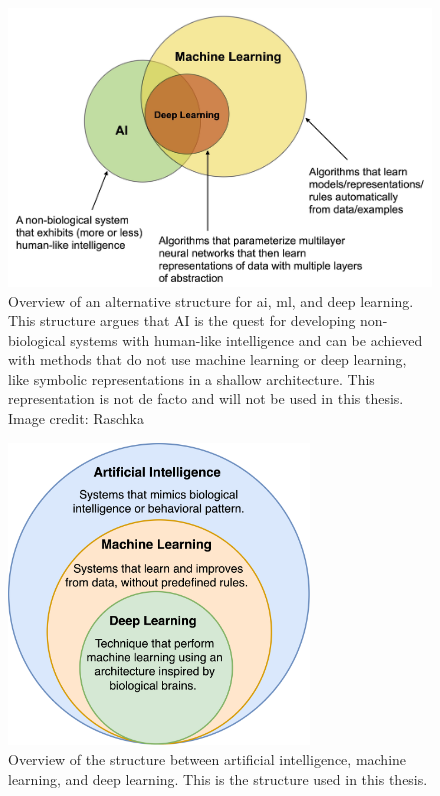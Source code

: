     \begin{figure}[htb]
        \centering
        \includegraphics[width=\linewidth]{images/ai_ml_dnn_argue.jpeg}
        \caption[Overview of an alternative structure for \gls{ai}, \gls{ml}, and deep learning. This structure argues that AI is the quest for developing non-biological systems with human-like intelligence and can be achieved with methods that do not use machine learning or deep learning, like symbolic representations in a shallow architecture.]{Overview of an alternative structure for \gls{ai}, \gls{ml}, and deep learning. This structure argues that AI is the quest for developing non-biological systems with human-like intelligence and can be achieved with methods that do not use machine learning or deep learning, like symbolic representations in a shallow architecture. This representation is not de facto and will not be used in this thesis. Image credit: Raschka \cite{raschkaChapterIntroductionMachine2020}}
        \label{fig:ai_ml_dnn_argue}
    \end{figure} 

    \begin{figure}[htb]
        \centering
        \includegraphics[width=8cm]{images/ai_ml_dnn.png}
        \caption{Overview of the structure between artificial intelligence, machine learning, and deep learning. This is the structure used in this thesis.}
        \label{fig:ai_ml_dnn}
    \end{figure} 


